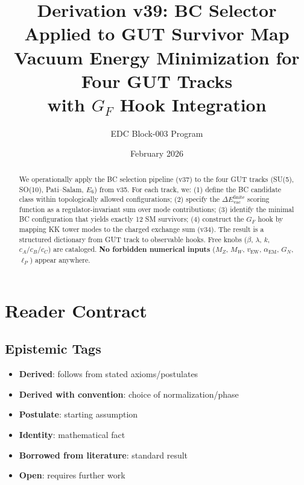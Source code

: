 \documentclass[11pt,a4paper]{article}
\title{\textbf{Derivation v39: BC Selector Applied to GUT Survivor Map} \\[0.5em]
\large Vacuum Energy Minimization for Four GUT Tracks \\
with $G_F$ Hook Integration}
\author{EDC Block-003 Program}
\date{February 2026}
\newcommand{\tagD}{\textcolor{blue!70!black}{[D]}}
\newcommand{\tagDc}{\textcolor{blue!50!black}{[Dc]}}
\newcommand{\tagP}{\textcolor{green!50!black}{[P]}}
\newcommand{\tagI}{\textcolor{gray}{[I]}}
\newcommand{\tagBL}{\textcolor{purple}{[BL]}}
\newcommand{\tagOPEN}{\textcolor{red!70!black}{[OPEN]}}
\begin{document}
\maketitle

\begin{abstract}
We operationally apply the BC selection pipeline (v37) to the four GUT tracks
(SU(5), SO(10), Pati--Salam, $E_6$) from v35. For each track, we: (1) define the
BC candidate class within topologically allowed configurations; (2) specify the
$\Delta E_{\text{vac}}^{\text{finite}}$ scoring function as a regulator-invariant
sum over mode contributions; (3) identify the minimal BC configuration that
yields exactly 12 SM survivors; (4) construct the $G_F$ hook by mapping KK tower
modes to the charged exchange sum (v34). The result is a structured dictionary
from GUT track to observable hooks. Free knobs ($\beta$, $\lambda$, $k$, $c_A/c_B/c_C$)
are cataloged. \textbf{No forbidden numerical inputs} ($M_Z$, $M_W$, $v_{\text{EW}}$,
$\alpha_{\text{EM}}$, $G_N$, $\ell_P$) appear anywhere.
\end{abstract}

\tableofcontents
\newpage

\section{Reader Contract}

\subsection{Epistemic Tags}
\begin{itemize}[leftmargin=2cm]
    \item[\tagD] \textbf{Derived}: follows from stated axioms/postulates
    \item[\tagDc] \textbf{Derived with convention}: choice of normalization/phase
    \item[\tagP] \textbf{Postulate}: starting assumption
    \item[\tagI] \textbf{Identity}: mathematical fact
    \item[\tagBL] \textbf{Borrowed from literature}: standard result
    \item[\tagOPEN] \textbf{Open}: requires further work
\end{itemize}
\end{document}
